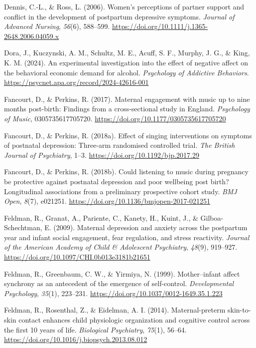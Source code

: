\documentclass[
]{article}
\newlength{\cslhangindent}
\newenvironment{CSLReferences}[2] %
 {\begin{list}{}{%
  \setlength{\itemindent}{0pt}
  \setlength{\leftmargin}{0pt}
  \setlength{\parsep}{0pt}
  \ifodd #1
   \setlength{\leftmargin}{\cslhangindent}
   \setlength{\itemindent}{-1\cslhangindent}
  \fi
  \setlength{\itemsep}{#2\baselineskip}}}
 {\end{list}}
\begin{document}
\begin{CSLReferences}{1}{0}
Dennis, C.-L., \& Ross, L. (2006). Women's perceptions of partner
support and conflict in the development of postpartum depressive
symptoms. \emph{Journal of Advanced Nursing}, \emph{56}(6), 588--599.
\url{https://doi.org/10.1111/j.1365-2648.2006.04059.x}

Dora, J., Kuczynski, A. M., Schultz, M. E., Acuff, S. F., Murphy, J. G.,
\& King, K. M. (2024). An experimental investigation into the effect of
negative affect on the behavioral economic demand for alcohol.
\emph{Psychology of Addictive Behaviors}.
\url{https://psycnet.apa.org/record/2024-42616-001}

Fancourt, D., \& Perkins, R. (2017). Maternal engagement with music up
to nine months post-birth: {Findings} from a cross-sectional study in
{England}. \emph{Psychology of Music}, 0305735617705720.
\url{https://doi.org/10.1177/0305735617705720}

Fancourt, D., \& Perkins, R. (2018a). Effect of singing interventions on
symptoms of postnatal depression: Three-arm randomised controlled trial.
\emph{The British Journal of Psychiatry}, 1--3.
\url{https://doi.org/10.1192/bjp.2017.29}

Fancourt, D., \& Perkins, R. (2018b). Could listening to music during
pregnancy be protective against postnatal depression and poor wellbeing
post birth? {Longitudinal} associations from a preliminary prospective
cohort study. \emph{BMJ Open}, \emph{8}(7), e021251.
\url{https://doi.org/10.1136/bmjopen-2017-021251}

Feldman, R., Granat, A., Pariente, C., Kanety, H., Kuint, J., \&
Gilboa-Schechtman, E. (2009). Maternal depression and anxiety across the
postpartum year and infant social engagement, fear regulation, and
stress reactivity. \emph{Journal of the American Academy of Child \&
Adolescent Psychiatry}, \emph{48}(9), 919--927.
\url{https://doi.org/10.1097/CHI.0b013e3181b21651}

Feldman, R., Greenbaum, C. W., \& Yirmiya, N. (1999). Mother--infant
affect synchrony as an antecedent of the emergence of self-control.
\emph{Developmental Psychology}, \emph{35}(1), 223--231.
\url{https://doi.org/10.1037/0012-1649.35.1.223}

Feldman, R., Rosenthal, Z., \& Eidelman, A. I. (2014). Maternal-preterm
skin-to-skin contact enhances child physiologic organization and
cognitive control across the first 10 years of life. \emph{Biological
Psychiatry}, \emph{75}(1), 56--64.
\url{https://doi.org/10.1016/j.biopsych.2013.08.012}


\end{CSLReferences}
\end{document}
